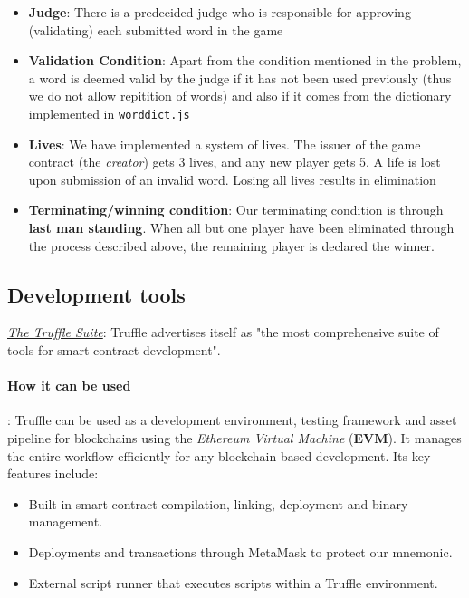 \documentclass{article}
\begin{document}
\begin{itemize}
    \item[] \textbf{Judge}:
    There is a predecided judge who is responsible for approving (validating) each
    submitted word in the game
    \item[] \textbf{Validation Condition}:
    Apart from the condition mentioned in the problem, a word is deemed valid by the
    judge if it has not been used previously (thus we do not allow repitition of words)
    and also if it comes from the dictionary implemented in \verb|worddict.js|
    \item[] \textbf{Lives}:
    We have implemented a system of lives. The issuer of the game contract (the \textit{creator}) gets 3 lives, and any new player gets 5. A life is lost upon
    submission of an invalid word. Losing all lives results in elimination
    \item[] \textbf{Terminating/winning condition}: 
    Our terminating condition is through \textbf{last man standing}. When all but one
    player have been eliminated through the process described above, the remaining
    player is declared the winner.
\end{itemize}

    \subsection{Development tools} 
    \href{https://trufflesuite.com/}{\textit{The Truffle Suite}}:
    Truffle advertises itself as "the most comprehensive suite of tools for smart
    contract development". 
    \paragraph{How it can be used}:
    Truffle can be used as a development environment, testing framework and asset
    pipeline for blockchains using the \emph{Ethereum Virtual Machine} (\textbf{EVM}).
    It manages the entire workflow efficiently for any blockchain-based development.
    Its key features include:
    \begin{itemize}
        \item Built-in smart contract compilation, linking, deployment and binary management.
        \item Deployments and transactions through MetaMask to protect our mnemonic.
        \item External script runner that executes scripts within a Truffle environment.
    \end{itemize}
\end{document}
